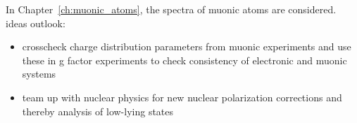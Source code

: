 In Chapter~\ref{ch:muonic_atoms}, the spectra of muonic atoms are considered.\\

ideas outlook:
\begin{itemize}
\item crosscheck charge distribution parameters from muonic experiments and use these in g factor experiments to check consistency of electronic and muonic systems
\item team up with nuclear physics for new nuclear polarization corrections and thereby analysis of low-lying states
\end{itemize}
 






